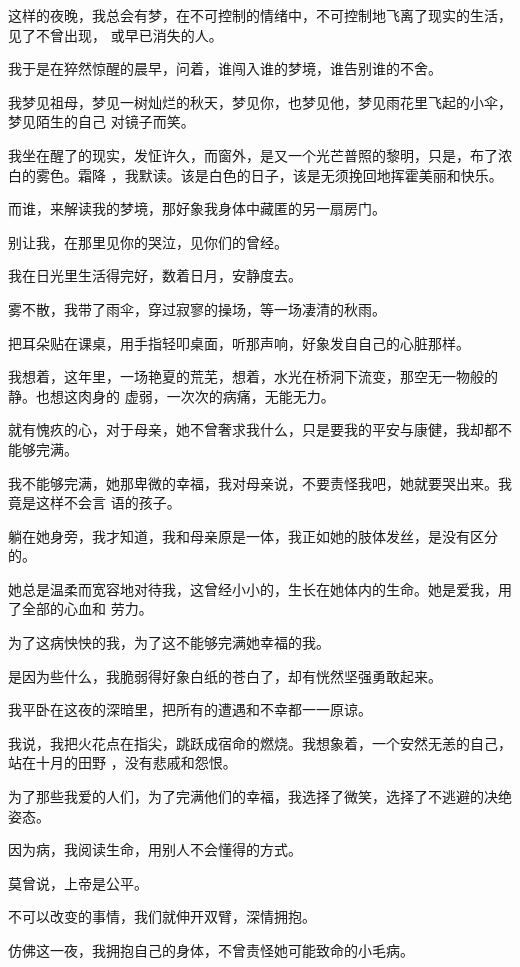 \documentclass[12pt,a4paper]{article}
\begin{document}
		这样的夜晚，我总会有梦，在不可控制的情绪中，不可控制地飞离了现实的生活，见了不曾出现，
	或早已消失的人。

		我于是在猝然惊醒的晨早，问着，谁闯入谁的梦境，谁告别谁的不舍。

		我梦见祖母，梦见一树灿烂的秋天，梦见你，也梦见他，梦见雨花里飞起的小伞，梦见陌生的自己
	对镜子而笑。

		我坐在醒了的现实，发怔许久，而窗外，是又一个光芒普照的黎明，只是，布了浓白的雾色。霜降
	，我默读。该是白色的日子，该是无须挽回地挥霍美丽和快乐。


		而谁，来解读我的梦境，那好象我身体中藏匿的另一扇房门。

		别让我，在那里见你的哭泣，见你们的曾经。


		我在日光里生活得完好，数着日月，安静度去。


		雾不散，我带了雨伞，穿过寂寥的操场，等一场凄清的秋雨。

		把耳朵贴在课桌，用手指轻叩桌面，听那声响，好象发自自己的心脏那样。


		我想着，这年里，一场艳夏的荒芜，想着，水光在桥洞下流变，那空无一物般的静。也想这肉身的
	虚弱，一次次的病痛，无能无力。


		就有愧疚的心，对于母亲，她不曾奢求我什么，只是要我的平安与康健，我却都不能够完满。


		我不能够完满，她那卑微的幸福，我对母亲说，不要责怪我吧，她就要哭出来。我竟是这样不会言
	语的孩子。

		躺在她身旁，我才知道，我和母亲原是一体，我正如她的肢体发丝，是没有区分的。

		她总是温柔而宽容地对待我，这曾经小小的，生长在她体内的生命。她是爱我，用了全部的心血和
	劳力。

		为了这病怏怏的我，为了这不能够完满她幸福的我。


		是因为些什么，我脆弱得好象白纸的苍白了，却有恍然坚强勇敢起来。

		我平卧在这夜的深暗里，把所有的遭遇和不幸都一一原谅。


		我说，我把火花点在指尖，跳跃成宿命的燃烧。我想象着，一个安然无恙的自己，站在十月的田野
	，没有悲戚和怨恨。

		为了那些我爱的人们，为了完满他们的幸福，我选择了微笑，选择了不逃避的决绝姿态。


		因为病，我阅读生命，用别人不会懂得的方式。

		莫曾说，上帝是公平。


		不可以改变的事情，我们就伸开双臂，深情拥抱。

		仿佛这一夜，我拥抱自己的身体，不曾责怪她可能致命的小毛病。
\end{document}
